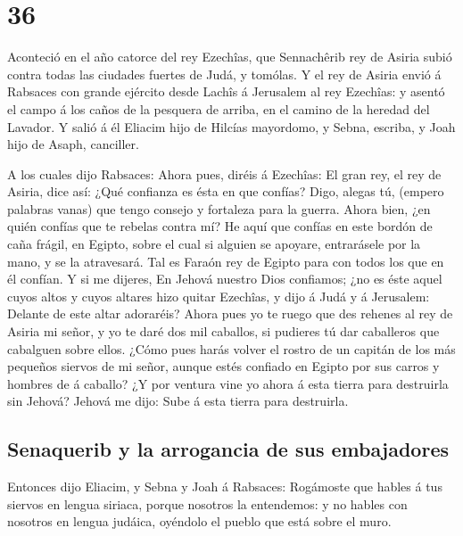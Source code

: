 \hypertarget{section-35}{%
\section{36}\label{section-35}}

 Aconteció en el año catorce del rey Ezechîas, que
Sennachêrib rey de Asiria subió contra todas las ciudades fuertes de
Judá, y tomólas.  Y el rey de Asiria envió á Rabsaces con
grande ejército desde Lachîs á Jerusalem al rey Ezechîas: y asentó el
campo á los caños de la pesquera de arriba, en el camino de la heredad
del Lavador.  Y salió á él Eliacim hijo de Hilcías
mayordomo, y Sebna, escriba, y Joah hijo de Asaph, canciller.

 A los cuales dijo Rabsaces: Ahora pues, diréis á
Ezechîas: El gran rey, el rey de Asiria, dice así: ¿Qué confianza es
ésta en que confías?  Digo, alegas tú, (empero palabras
vanas) que tengo consejo y fortaleza para la guerra. Ahora bien, ¿en
quién confías que te rebelas contra mí?  He aquí que
confías en este bordón de caña frágil, en Egipto, sobre el cual si
alguien se apoyare, entrarásele por la mano, y se la atravesará. Tal es
Faraón rey de Egipto para con todos los que en él confían.
 Y si me dijeres, En Jehová nuestro Dios confiamos; ¿no es
éste aquel cuyos altos y cuyos altares hizo quitar Ezechîas, y dijo á
Judá y á Jerusalem: Delante de este altar adoraréis? 
Ahora pues yo te ruego que des rehenes al rey de Asiria mi señor, y yo
te daré dos mil caballos, si pudieres tú dar caballeros que cabalguen
sobre ellos.  ¿Cómo pues harás volver el rostro de un
capitán de los más pequeños siervos de mi señor, aunque estés confiado
en Egipto por sus carros y hombres de á caballo?  ¿Y por
ventura vine yo ahora á esta tierra para destruirla sin Jehová? Jehová
me dijo: Sube á esta tierra para destruirla.

\hypertarget{senaquerib-y-la-arrogancia-de-sus-embajadores}{%
\subsection{Senaquerib y la arrogancia de sus
embajadores}\label{senaquerib-y-la-arrogancia-de-sus-embajadores}}

 Entonces dijo Eliacim, y Sebna y Joah á Rabsaces:
Rogámoste que hables á tus siervos en lengua siriaca, porque nosotros la
entendemos: y no hables con nosotros en lengua judáica, oyéndolo el
pueblo que está sobre el muro.

